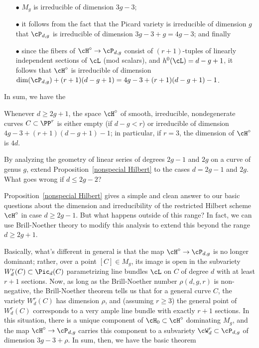 \begin{enumerate}

\item[$\bullet$]  $M_g$ is irreducible of dimension $3g-3$;

\item[$\bullet$] it follows from the fact that the Picard variety is irreducible of dimension $g$ that $\cP_{d,g}$ is irreducible of dimension $3g-3+g = 4g-3$; and finally

\item[$\bullet$] since the fibers of $\cH^\circ \to \cP_{d,g}$ consist of $(r+1)$-tuples of linearly independent sections of $\cL$ (mod scalars), and $h^0(\cL) = d-g+1$, it follows that $\cH^\circ$ is irreducible of dimension $\dim(\cP_{d,g}) + (r+1)(d-g+1) = 4g-3 + (r+1)(d-g+1) - 1$.

\end{enumerate}

In sum, we have the

\begin{proposition}\label{nonspecial Hilbert}
Whenever $d \geq 2g+1$, the space $\cH^\circ$ of smooth, irreducible, nondegenerate curves $C \subset \PP^r$ is either empty (if $d-g < r$) or irreducible of dimension $4g-3 + (r+1)(d-g+1) - 1$; in particular, if $r=3$, the dimension of $\cH^\circ$ is $4d$.
\end{proposition}

\begin{exercise}
By analyzing the geometry of linear series of degrees $2g-1$ and $2g$ on a curve of genus $g$, extend Proposition~\ref{nonspecial Hilbert} to the cases $d = 2g-1$ and $2g$. What goes wrong if $d \leq 2g-2$?
\end{exercise}

Proposition~\ref{nonspecial Hilbert} gives a simple and clean answer to our basic questions about the dimension and irreducibility of the restricted Hilbert scheme $\cH^\circ$ in case $d \geq 2g-1$. But what happens outside of this range? In fact, we  can use Brill-Noether theory to modify this analysis to extend this beyond the range $d \geq 2g+1$.

Basically, what's different in general is that the map $\cH^\circ \to \cP_{d,g}$ is no longer dominant; rather, over a point $[C] \in M_g$, its image is open in the subvariety $W^r_d(C) \subset \Pic_d(C)$ parametrizing line bundles $\cL$ on $C$ of degree $d$ with at least $r+1$ sections. Now, as long as the Brill-Noether number $\rho(d,g,r)$ is non-negative, the Brill-Noether theorem tells us that for a general curve $C$, the variety $W^r_d(C)$ has dimension $\rho$, and (assuming $r \geq 3$) the general point of $W^r_d(C)$ corresponds to a very ample line bundle with exactly $r+1$ sections. In this situation, there is a unique component of $\cH_0 \subset \cH^\circ$ dominating $M_g$, and the map $\cH^\circ \to \cP_{d,g}$ carries this component to a subvariety $\cW^r_d \subset \cP_{d,g}$ of dimension $3g-3 + \rho$. In sum, then, we have the basic theorem

